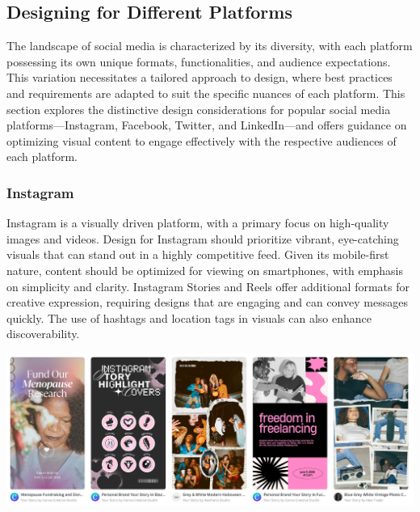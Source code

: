 \documentclass[
]{book}
\begin{document}
\hypertarget{designing-for-different-platforms}{%
\subsection*{Designing for Different Platforms}\label{designing-for-different-platforms}}

The landscape of social media is characterized by its diversity, with each platform possessing its own unique formats, functionalities, and audience expectations. This variation necessitates a tailored approach to design, where best practices and requirements are adapted to suit the specific nuances of each platform. This section explores the distinctive design considerations for popular social media platforms---Instagram, Facebook, Twitter, and LinkedIn---and offers guidance on optimizing visual content to engage effectively with the respective audiences of each platform.

\hypertarget{instagram-1}{%
\subsubsection*{Instagram}\label{instagram-1}}

Instagram is a visually driven platform, with a primary focus on high-quality images and videos. Design for Instagram should prioritize vibrant, eye-catching visuals that can stand out in a highly competitive feed. Given its mobile-first nature, content should be optimized for viewing on smartphones, with emphasis on simplicity and clarity. Instagram Stories and Reels offer additional formats for creative expression, requiring designs that are engaging and can convey messages quickly. The use of hashtags and location tags in visuals can also enhance discoverability.

\href{https://www.canva.com/instagram-stories/templates/}{\includegraphics[width=1\textwidth,height=\textheight]{images/clipboard-2708767155.png}}
\end{document}
